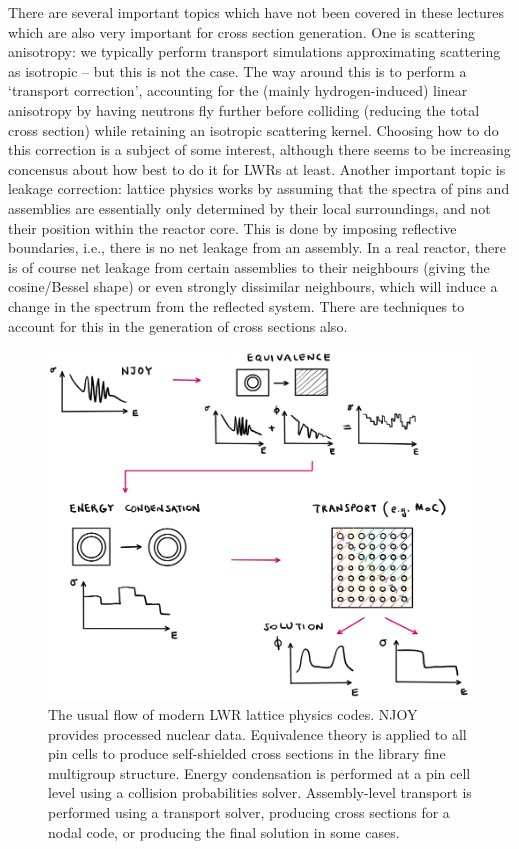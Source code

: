 There are several important topics which have not been covered in these lectures which are also very important for cross section generation. One is scattering anisotropy: we typically perform transport simulations approximating scattering as isotropic -- but this is not the case. The way around this is to perform a `transport correction', accounting for the (mainly hydrogen-induced) linear anisotropy by having neutrons fly further before colliding (reducing the total cross section) while retaining an isotropic scattering kernel. Choosing how to do this correction is a subject of some interest, although there seems to be increasing concensus about how best to do it for LWRs at least. Another important topic is leakage correction: lattice physics works by assuming that the spectra of pins and assemblies are essentially only determined by their local surroundings, and not their position within the reactor core. This is done by imposing reflective boundaries, i.e., there is no net leakage from an assembly. In a real reactor, there is of course net leakage from certain assemblies to their neighbours (giving the cosine/Bessel shape) or even strongly dissimilar neighbours, which will induce a change in the spectrum from the reflected system. There are techniques to account for this in the generation of cross sections also.
\vspace{10pt}
\begin{figure}[h]
  \centering
  \includegraphics[width=\textwidth]{./Figures/P7/summary_lattice_physics.png} 
  \caption{The usual flow of modern LWR lattice physics codes. NJOY provides processed nuclear data. Equivalence theory is applied to all pin cells to produce self-shielded cross sections in the library fine multigroup structure. Energy condensation is performed at a pin cell level using a collision probabilities solver. Assembly-level transport is performed using a transport solver, producing cross sections for a nodal code, or producing the final solution in some cases.} 
  \label{fig:lattice}
\end{figure}

